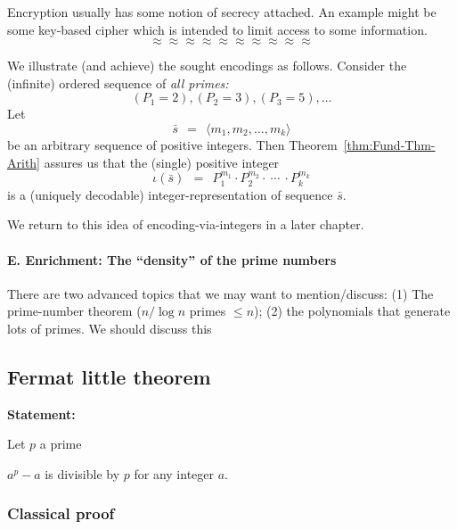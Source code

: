 Encryption usually has some notion of secrecy attached.  An example
might be some key-based cipher which is intended to limit access to
some information.
\[ \approx \approx \approx \approx \approx \approx \approx \approx \approx \approx \]

We illustrate (and achieve) the sought encodings as follows.  Consider
the (infinite) ordered sequence of {\em all primes:}
\[ (P_1 = 2), (P_2 = 3), (P_3 = 5), \ldots  \]
Let
\begin{equation}
\label{eq:sequence-vec-s}
\bar{s} \ \ = \ \ \langle m_1, m_2, \ldots, m_k \rangle
\end{equation}
be an arbitrary sequence of positive integers.  Then
Theorem~\ref{thm:Fund-Thm-Arith} assures us that the (single) positive
integer
\[ 
\iota(\bar{s}) \ \ = \ \ P_1^{m_1} \cdot P_2^{m_2} \cdot \ \cdots \
\cdot P_k^{m_k}
\]
is a (uniquely decodable) integer-representation of sequence $\bar{s}$.

We return to this idea of encoding-via-integers in a later chapter.

\paragraph{\small\sf E. Enrichment: The ``density'' of the prime numbers}

{\Arny There are two advanced topics that we may want to
  mention/discuss: (1) The prime-number theorem ($n/ \log n$ primes
  $\leq n$); (2) the polynomials that generate lots of primes.  We
  should discuss this}
  

\subsection{Fermat little theorem}
\label{sec:fermat}

\noindent \textbf{Statement:}

Let $p$ a prime

$a^p − a$ is divisible by $p$ for any integer $a$.

%
%

\subsubsection{Classical proof}


